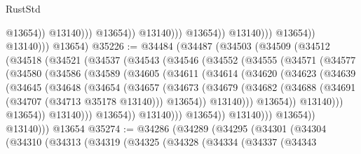 \begin{lexlean}{RustStd}
\begin{coremodule}
                                              @13654))
                                          @13140)))
                                    @13654))
                                @13140)))
                          @13654))
                      @13140)))
                @13654))
            @13140)))
      @13654)
@35226 := @34484
    (@34487
      (@34503
        (@34509
          (@34512
            (@34518
              (@34521
                (@34537
                  (@34543
                    (@34546
                      (@34552
                        (@34555
                          (@34571
                            (@34577
                              (@34580
                                (@34586
                                  (@34589
                                    (@34605
                                      (@34611
                                        (@34614
                                          (@34620
                                            (@34623
                                              (@34639
                                                (@34645
                                                  (@34648
                                                    (@34654
                                                      (@34657
                                                        (@34673
                                                          (@34679
                                                            (@34682
                                                              (@34688
                                                                (@34691
                                                                  (@34707 (@34713 @35178 @13140)))
                                                                @13654))
                                                            @13140)))
                                                      @13654))
                                                  @13140)))
                                            @13654))
                                        @13140)))
                                  @13654))
                              @13140)))
                        @13654))
                    @13140)))
              @13654))
          @13140)))
    @13654
@35274 := @34286
    (@34289
      (@34295
        (@34301
          (@34304
            (@34310
              (@34313
                (@34319
                  (@34325
                    (@34328
                      (@34334
                        (@34337
                          (@34343

\end{coremodule}
\end{lexlean}
